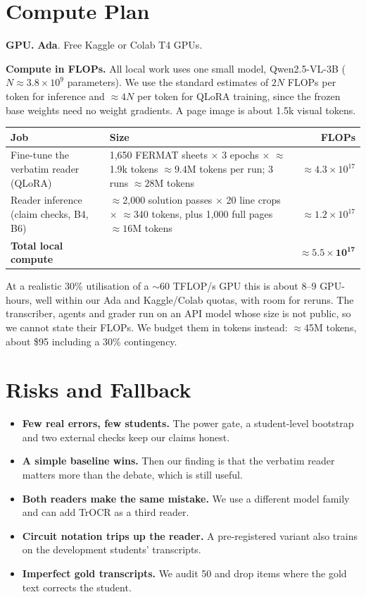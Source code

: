 \documentclass[11pt,a4paper]{article}
\begin{document}
\section{Compute Plan}

\textbf{GPU.} \textbf{Ada}. Free Kaggle or Colab T4 GPUs.

\textbf{Compute in FLOPs.} All local work uses one small model, Qwen2.5-VL-3B ($N \approx 3.8\times10^{9}$ parameters). We use the standard estimates of $2N$ FLOPs per token for inference and $\approx 4N$ per token for QLoRA training, since the frozen base weights need no weight gradients. A page image is about 1.5k visual tokens.

\begin{center}
\footnotesize
\begin{tabularx}{\textwidth}{@{}P{4.3cm}Yr@{}}
\toprule
Job & Size & FLOPs \\
\midrule
Fine-tune the verbatim reader (QLoRA) & 1,650 FERMAT sheets $\times$ 3 epochs $\times$ $\approx$1.9k tokens $\approx 9.4$M tokens per run; 3 runs $\approx 28$M tokens & $\approx 4.3\times10^{17}$ \\
Reader inference (claim checks, B4, B6) & $\approx$2,000 solution passes $\times$ 20 line crops $\times$ $\approx$340 tokens, plus 1,000 full pages $\approx 16$M tokens & $\approx 1.2\times10^{17}$ \\
\midrule
\textbf{Total local compute} & & $\mathbf{\approx 5.5\times10^{17}}$ \\
\bottomrule
\end{tabularx}
\end{center}

At a realistic 30\% utilisation of a $\sim$60 TFLOP/s GPU this is about 8--9 GPU-hours, well within our Ada and Kaggle/Colab quotas, with room for reruns. The transcriber, agents and grader run on an API model whose size is not public, so we cannot state their FLOPs. We budget them in tokens instead: $\approx$45M tokens, about \$95 including a 30\% contingency.


\section{Risks and Fallback}
\begin{itemize}
\item \textbf{Few real errors, few students.} The power gate, a student-level bootstrap and two external checks keep our claims honest.
\item \textbf{A simple baseline wins.} Then our finding is that the verbatim reader matters more than the debate, which is still useful.
\item \textbf{Both readers make the same mistake.} We use a different model family and can add TrOCR as a third reader.
\item \textbf{Circuit notation trips up the reader.} A pre-registered variant also trains on the development students' transcripts.
\item \textbf{Imperfect gold transcripts.} We audit 50 and drop items where the gold text corrects the student.
\end{itemize}
\end{document}
